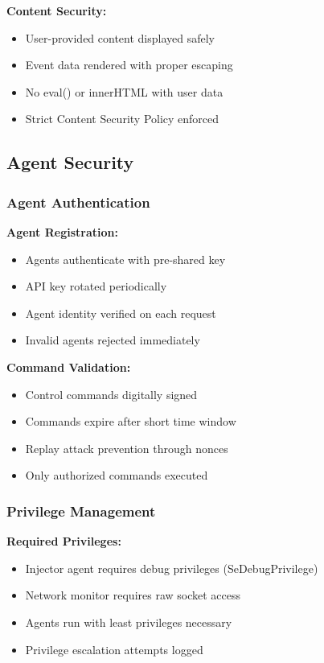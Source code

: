\textbf{Content Security:}
\begin{itemize}
    \item User-provided content displayed safely
    \item Event data rendered with proper escaping
    \item No eval() or innerHTML with user data
    \item Strict Content Security Policy enforced
\end{itemize}

\subsection{Agent Security}

\subsubsection{Agent Authentication}

\textbf{Agent Registration:}
\begin{itemize}
    \item Agents authenticate with pre-shared key
    \item API key rotated periodically
    \item Agent identity verified on each request
    \item Invalid agents rejected immediately
\end{itemize}

\textbf{Command Validation:}
\begin{itemize}
    \item Control commands digitally signed
    \item Commands expire after short time window
    \item Replay attack prevention through nonces
    \item Only authorized commands executed
\end{itemize}

\subsubsection{Privilege Management}

\textbf{Required Privileges:}
\begin{itemize}
    \item Injector agent requires debug privileges (SeDebugPrivilege)
    \item Network monitor requires raw socket access
    \item Agents run with least privileges necessary
    \item Privilege escalation attempts logged
\end{itemize}

